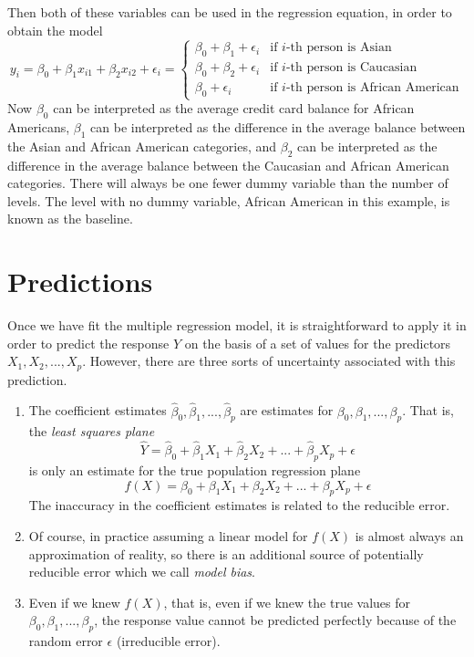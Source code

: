 Then both of these variables can be used in the regression equation, in
order to obtain the model
\[y_i = \beta_0 + \beta_1 x_{i1} + \beta_2x_{i2} + \epsilon_i = 
\begin{cases}
    \beta_0 + \beta_1 + \epsilon_i & \text{if $i$-th person is Asian}\\
    \beta_0 + \beta_2 + \epsilon_i & \text{if $i$-th person is Caucasian}\\
    \beta_0 + \epsilon_i & \text{if $i$-th person is African American}
\end{cases}
\]
Now $\beta_0$ can be interpreted as the average credit card balance for African Americans, $\beta_1$ can be interpreted as the difference in the average balance between the Asian and African American categories, and $\beta_2$ can be interpreted as the difference in the average balance between the Caucasian and African American categories. There will always be one fewer dummy variable than the number of levels. The level with no dummy variable, African American in this example, is known as the baseline.

\section{Predictions}
Once we have fit the multiple regression model, it is straightforward to apply it in  order to predict the response $Y$ on the basis of a set of values for the predictors $X_1, X_2,...,X_p$. However, there are three sorts of uncertainty associated with this prediction.
\begin{enumerate}
    \item The coefficient estimates $\hat\beta_0, \hat\beta_1,..., \hat\beta_p$ are estimates for $\beta_0, \beta_1,...,\beta_p$. That is, the \textit{least squares plane}
    \[\hat{Y} = \hat\beta_0 + \hat\beta_1 X_1 + \hat\beta_2 X_2 + ... + \hat\beta_p X_p + \epsilon\]
    is only an estimate for the true population regression plane
    \[f(X) = \beta_0 + \beta_1 X_1 + \beta_2 X_2 + ... + \beta_p X_p + \epsilon\]
    The inaccuracy in the coefficient estimates is related to the reducible error.

    \item Of course, in practice assuming a linear model for $f(X)$ is almost always an approximation of reality, so there is an additional source of potentially reducible error which we call \textit{model bias}.

    \item  Even if we knew $f(X)$, that is, even if we knew the true values for $\beta_0, \beta_1,...,\beta_p$, the response value cannot be predicted perfectly because of the random error $\epsilon$ (irreducible error).
\end{enumerate}

